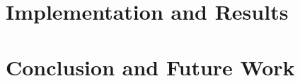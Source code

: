 \section{Implementation and Results}
\label{animationpak_}


\section{Conclusion and Future Work}
\label{animationpak_}


